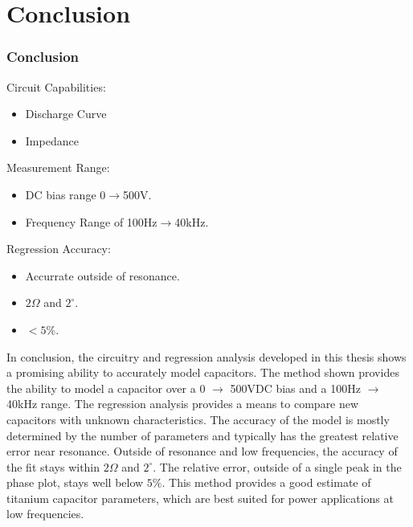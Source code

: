 \section {Conclusion}
\label{sec:conclusion}

\ifisPPT
\begin{frame}
    \frametitle{Conclusion}

Circuit Capabilities:
\begin{itemize}
    \item Discharge Curve
    \item Impedance
\end{itemize}

Measurement Range:
\begin{itemize}
    \item DC bias range 0$\rightarrow$500V.
    \item Frequency Range of 100Hz$\rightarrow$40kHz.
\end{itemize}

Regression Accuracy:
\begin{itemize}
    \item Accurrate outside of resonance.
    \item $2 \Omega$ and $2^{\circ}$.
    \item $<5\%$.
\end{itemize}
\end{frame}
\else
In conclusion, the circuitry and regression analysis developed in this thesis shows a promising ability to accurately model capacitors. The method shown provides the ability to model a capacitor over a 0 $\rightarrow$ 500VDC bias and a 100Hz $\rightarrow$ 40kHz range. The regression analysis provides a means to compare new capacitors with unknown characteristics. The accuracy of the model is mostly determined by the number of parameters and typically has the greatest relative error near resonance. Outside of resonance and low frequencies, the accuracy of the fit stays within $2 \Omega$ and $2^{\circ}$. The relative error, outside of a single peak in the phase plot, stays well below $5\%$. This method provides a good estimate of titanium capacitor parameters, which are best suited for power applications  at low frequencies.
\fi

